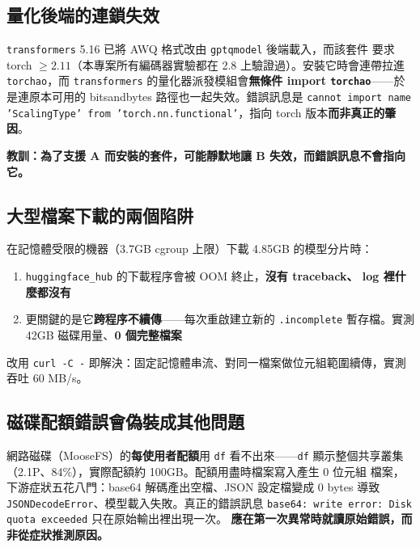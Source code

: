 \documentclass[11pt,a4paper]{ctexart}
\begin{document}
\subsection{量化後端的連鎖失效}

\texttt{transformers} 5.16 已將 AWQ 格式改由 \texttt{gptqmodel} 後端載入，而該套件
要求 torch $\ge 2.11$（本專案所有編碼器實驗都在 2.8 上驗證過）。安裝它時會連帶拉進
\texttt{torchao}，而 \texttt{transformers} 的量化器派發模組會\textbf{無條件 import
\texttt{torchao}}——於是連原本可用的 bitsandbytes 路徑也一起失效。錯誤訊息是
\texttt{cannot import name 'ScalingType' from 'torch.nn.functional'}，指向 torch
版本\textbf{而非真正的肇因}。

\textbf{教訓：為了支援 A 而安裝的套件，可能靜默地讓 B 失效，而錯誤訊息不會指向它。}

\subsection{大型檔案下載的兩個陷阱}

在記憶體受限的機器（3.7GB cgroup 上限）下載 4.85GB 的模型分片時：

\begin{enumerate}[leftmargin=2em, itemsep=1pt]
  \item \texttt{huggingface\_hub} 的下載程序會被 OOM 終止，\textbf{沒有 traceback、
        log 裡什麼都沒有}
  \item 更關鍵的是它\textbf{跨程序不續傳}——每次重啟建立新的 \texttt{.incomplete}
        暫存檔。實測 42GB 磁碟用量、\textbf{0 個完整檔案}
\end{enumerate}

改用 \texttt{curl -C -} 即解決：固定記憶體串流、對同一檔案做位元組範圍續傳，實測
吞吐 60 MB/s。

\subsection{磁碟配額錯誤會偽裝成其他問題}

網路磁碟（MooseFS）的\textbf{每使用者配額}用 \texttt{df} 看不出來——\texttt{df}
顯示整個共享叢集（2.1P、84\%），實際配額約 100GB。配額用盡時檔案寫入產生 0 位元組
檔案，下游症狀五花八門：base64 解碼產出空檔、JSON 設定檔變成 0 bytes 導致
\texttt{JSONDecodeError}、模型載入失敗。真正的錯誤訊息
\texttt{base64: write error: Disk quota exceeded} 只在原始輸出裡出現一次。
\textbf{應在第一次異常時就讀原始錯誤，而非從症狀推測原因。}

\end{document}
